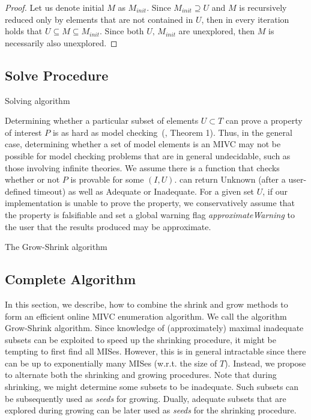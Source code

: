 \begin{proof}
Let us denote initial $M$ as $M_{init}$. Since $M_{init} \supseteq U$ and $M$ is recursively reduced only by elements that are not contained in $U$, then in every iteration holds that $U \subseteq M \subseteq M_{init}$. Since both $U, \, M_{init}$ are unexplored, then $M$ is necessarily also unexplored.
\end{proof}

\subsection{Solve Procedure}

\begin{algorithm}[t]
\begin{small}

\caption{Solving algorithm}
\label{alg:solve}
\end{small}
\end{algorithm}

Determining whether a particular subset of elements $U \subset T$ can prove a property of interest $P$ is as hard as model checking~(\cite{Ghass16}, Theorem 1).  Thus, in the general case, determining whether a set of model elements is an MIVC may not be possible for model checking problems that are in general undecidable, such as those involving infinite theories.  We assume there is a function \CheckAdq that checks
whether or not $P$ is provable for some $(I, U)$.  \CheckAdq can return {\sc Unknown}
(after a user-defined timeout) as well as {\sc Adequate}
or {\sc Inadequate}.  For a given set $U$, if our implementation is
unable to prove the property, we conservatively assume that
the property is falsifiable and set a global warning flag {\em approximateWarning} to the
user that the results produced may be approximate.

\begin{algorithm}[t!]
\begin{small}

\caption{The Grow-Shrink algorithm}
\label{alg:allmivc}
\end{small}
\end{algorithm}


\subsection{Complete Algorithm}
In this section, we describe, how to combine the shrink and grow methods to form an efficient online MIVC enumeration algorithm. We call the algorithm Grow-Shrink algorithm.
Since knowledge of (approximately) maximal inadequate subsets can be exploited to speed up the shrinking procedure, it might be tempting to first find all MISes.
However, this is in general intractable since there can be up to exponentially many MISes (w.r.t. the size of $T$).
Instead, we propose to alternate both the shrinking and growing procedures.
Note that during shrinking, we might determine some subsets to be inadequate. Such subsets can be subsequently used as \emph{seeds} for growing.
Dually, adequate subsets that are explored during growing can be later used as \emph{seeds} for the shrinking procedure.

